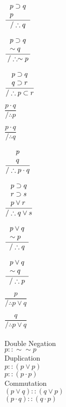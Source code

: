 \documentclass[12pt]{article}
\begin{document}
$\dfrac{\begin{tabular}{l}$p\supset q$ \\ $p$ \end{tabular}}{/\therefore q}$


$\dfrac{\begin{tabular}{l}$p\supset q$ \\ $\sim q$ \end{tabular}}{/\therefore \sim p}$

$\dfrac{\begin{tabular}{l}$p\supset q$ \\ $q\supset r$ \end{tabular}}{/\therefore p \subset r}$

$\dfrac{p\cdot q}{/\therefore p}$

$\dfrac{p\cdot q}{/\therefore q}$

$\dfrac{\begin{tabular}{l}$p$ \\ $q$ \end{tabular}}{/\therefore p\cdot q}$

$\dfrac{\begin{tabular}{l}$p\supset q$ \\ $r\supset s$ \\ $p\lor r$ \end{tabular}}{/\therefore q \lor s}$

$\dfrac{\begin{tabular}{l}$p\lor q$ \\ $\sim p$ \end{tabular}}{/\therefore q}$

$\dfrac{\begin{tabular}{l}$p\lor q$ \\ $\sim q$ \end{tabular}}{/\therefore p}$

$\dfrac{p}{/\therefore p\lor q}$

$\dfrac{q}{/\therefore p \lor q}$\\
 \\

Double Negation\\ 
$p :: \sim\sim p$\\

Duplication\\
$p :: (p\lor p)$\\
$p :: (p\cdot p)$\\

Commutation\\
$(p\lor q) :: (q\lor p)$\\
$(p\cdot q) :: (q\cdot p)$\\
\end{document}
